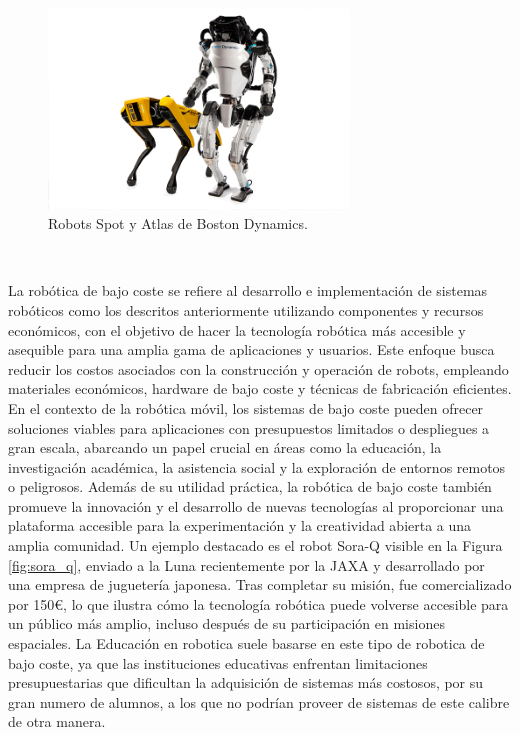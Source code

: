 \begin{figure} [h!]
  \begin{center}
    \includegraphics[width=8cm]{figs/atlas_spot_boston_dynamics}
  \end{center}
  \caption{Robots Spot y Atlas de Boston Dynamics.}
  \label{fig:atlas}
\end{figure}\

La robótica de bajo coste se refiere al desarrollo e implementación de sistemas
robóticos como los descritos anteriormente utilizando componentes y recursos
económicos, con el objetivo de hacer la tecnología robótica más accesible y
asequible para una amplia gama de aplicaciones y usuarios.
Este enfoque busca reducir los costos asociados con la construcción y operación
de robots, empleando materiales económicos, hardware de bajo coste y técnicas
de fabricación eficientes. En el contexto de la robótica móvil, los sistemas de
bajo coste pueden ofrecer soluciones viables para aplicaciones con presupuestos
limitados o despliegues a gran escala, abarcando un papel crucial en áreas como
la educación, la investigación académica, la asistencia social y la exploración
de entornos remotos o peligrosos.
Además de su utilidad práctica, la robótica de bajo coste también promueve la
innovación y el desarrollo de nuevas tecnologías al proporcionar una plataforma
accesible para la experimentación y la creatividad abierta a una amplia
comunidad.
Un ejemplo destacado es el robot Sora-Q visible en la Figura \ref{fig:sora_q},
enviado a la Luna recientemente por la JAXA y desarrollado por una empresa de
juguetería japonesa.
Tras completar su misión, fue comercializado por 150€, lo que ilustra cómo la
tecnología robótica puede volverse accesible para un público más amplio, incluso
después de su participación en misiones espaciales.
La Educación en robotica suele basarse en este tipo de robotica de bajo coste,
ya que las instituciones educativas enfrentan limitaciones presupuestarias que
dificultan la adquisición de sistemas más costosos, por su gran numero de
alumnos, a los que no podrían proveer de sistemas de este calibre de otra
manera.

